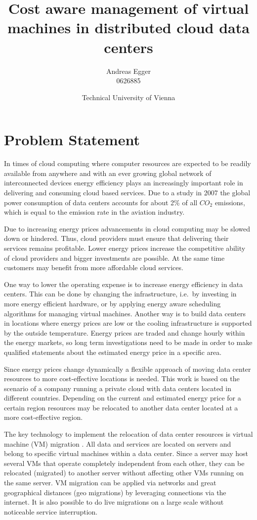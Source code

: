 \documentclass[a4paper]{article}
\title{Cost aware management of virtual machines in distributed cloud data centers}
\author{Andreas Egger \\0626885}
\date{Technical University of Vienna}
\begin{document}
\maketitle


\section{Problem Statement}

In times of cloud computing where computer resources are expected to be readily available from anywhere \cite{buyya2009cloud} and with an ever growing global network of interconnected devices energy efficiency plays an increasingly important role in delivering and consuming cloud based services. Due to a study in 2007 \cite{gartner2007gartner} the global power consumption of data centers accounts for about 2\% of all $CO_2$ emissions, which is equal to the emission rate in the aviation industry. 

Due to increasing energy prices advancements in cloud computing may be slowed down or hindered. Thus, cloud providers must ensure that delivering their services remains profitable. Lower energy prices increase the competitive ability of cloud providers and bigger investments are possible. At the same time customers may benefit from more affordable cloud services. 

One way to lower the operating expense is to increase energy efficiency in data centers. This can be done by changing the infrastructure, i.e.\ by investing in more energy efficient hardware, or by applying energy aware scheduling algorithms for managing virtual machines. Another way is to build data centers in locations where energy prices are low or the cooling infrastructure is supported by the outside temperature. Energy prices are traded and change hourly within the energy markets, so long term investigations need to be made in order to make qualified statements about the estimated energy price in a specific area.

Since energy prices change dynamically a flexible approach of moving data center resources to more cost-effective locations is needed. This work is based on the scenario of a company running a private cloud with data centers located in different countries. Depending on the current and estimated energy price for a certain region resources may be relocated to another data center located at a more cost-effective region.

The key technology to implement the relocation of data center resources is virtual machine (VM) migration \cite{nelson2009virtual}. All data and services are located on servers and belong to specific virtual machines within a data center. Since a server may host several VMs that operate completely independent from each other, they can be relocated (migrated) to another server without affecting other VMs running on the same server. VM migration can be applied via networks and great geographical distances (geo migrations) by leveraging connections via the internet. It is also possible to do live migrations on a large scale without noticeable service interruption. 
\end{document}
